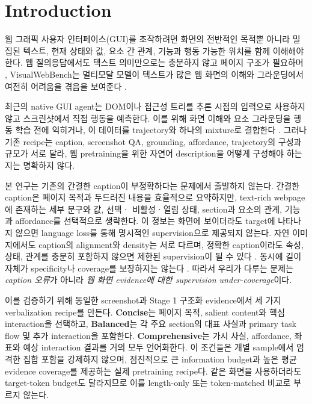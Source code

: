 \section{Introduction}

웹 그래픽 사용자 인터페이스(GUI)를 조작하려면 화면의 전반적인
목적뿐 아니라 밀집된 텍스트, 현재 상태와 값, 요소 간 관계, 기능과
행동 가능한 위치를 함께 이해해야 한다. 웹 질의응답에서도 텍스트
의미만으로는 충분하지 않고 페이지 구조가 필요하며
\citep{chen2021websrc}, VisualWebBench는 멀티모달 모델이
텍스트가 많은 웹 화면의 이해와 그라운딩에서 여전히 어려움을
겪음을 보여준다 \citep{liu2024visualwebbench}.

최근의 native GUI agent는 DOM이나 접근성 트리를 추론 시점의
입력으로 사용하지 않고 스크린샷에서 직접 행동을 예측한다. 이를
위해 화면 이해와 요소 그라운딩을 행동 학습 전에 익히거나, 이
데이터를 trajectory와 하나의 mixture로 결합한다
\citep{cheng2024seeclick,qin2025uitars,gupta2026molmoweb}. 그러나
기존 recipe는 caption, screenshot QA, grounding, affordance,
trajectory의 구성과 규모가 서로 달라, 웹 pretraining을 위한
자연어 description을 어떻게 구성해야 하는지는 명확하지 않다.

본 연구는 기존의 간결한 caption이 부정확하다는 문제에서 출발하지
않는다. 간결한 caption은 페이지 목적과 두드러진 내용을 효율적으로
요약하지만, text-rich webpage에 존재하는 세부 문구와 값, 선택ㆍ
비활성ㆍ열림 상태, section과 요소의 관계, 기능과 affordance를
선택적으로 생략한다. 이 정보는 화면에 보이더라도 target에 나타나지
않으면 language loss를 통해 명시적인 supervision으로 제공되지
않는다. 자연 이미지에서도 caption의 alignment와 density는 서로
다르며, 정확한 caption이라도 속성, 상태, 관계를 충분히 포함하지
않으면 제한된 supervision이 될 수 있다 \citep{doveh2023dac}.
동시에 길이 자체가 specificity나 coverage를 보장하지는 않는다
\citep{kapur2026morewords}. 따라서 우리가 다루는 문제는
\emph{caption 오류}가 아니라 \emph{웹 화면 evidence에 대한
supervision under-coverage}이다.



이를 검증하기 위해 동일한 screenshot과 Stage 1 구조화 evidence에서
세 가지 verbalization recipe를 만든다. \textbf{Concise}는 페이지
목적, salient content와 핵심 interaction을 선택하고,
\textbf{Balanced}는 각 주요 section의 대표 사실과 primary task
flow 및 추가 interaction을 포함한다. \textbf{Comprehensive}는
가시 사실, affordance, 좌표와 예상 interaction 결과를 거의 모두
언어화한다. 이 조건들은 개별 sample에서 엄격한 집합 포함을
강제하지 않으며, 점진적으로 큰 information budget과 높은 평균
evidence coverage를 제공하는 실제 pretraining recipe다. 같은
화면을 사용하더라도 target-token budget도 달라지므로 이를
length-only 또는 token-matched 비교로 부르지 않는다.


